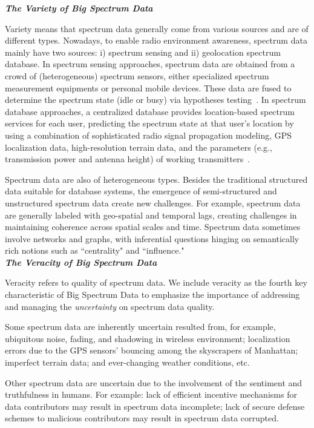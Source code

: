 \documentclass[12pt,draftcls,journal,letterpaper,oneside,onecolumn]{IEEEtran}
\begin{document}
\textbf{\emph{The Variety of Big Spectrum Data}}

Variety means that spectrum data generally come from various sources and are of different types. Nowadays, to enable radio environment awareness, spectrum data mainly have two sources: i) spectrum sensing and ii) geolocation spectrum database. In spectrum sensing approaches, spectrum data are obtained from a crowd of (heterogeneous) spectrum sensors, either specialized spectrum measurement equipments or personal mobile devices. These data are fused to determine the spectrum state (idle or busy) via hypotheses testing~\cite{SPMag2013}. In spectrum database approaches, a centralized database provides location-based spectrum services for each user, predicting the spectrum state at that user's location by using a combination of sophisticated radio signal propagation modeling, GPS localization data, high-resolution terrain data, and the parameters (e.g., transmission power and antenna height) of working transmitters~\cite{Senseless_2012}.

Spectrum data are also of heterogeneous types. Besides the traditional structured data suitable for database systems, the emergence of semi-structured and unstructured spectrum data create new challenges. For example, spectrum data are generally labeled with geo-spatial and temporal lags, creating challenges in maintaining coherence across spatial scales and time. Spectrum data sometimes involve networks and graphs, with inferential questions hinging on semantically rich notions such as ``centrality" and ``influence."
\\








\textbf{\emph{The Veracity of Big Spectrum Data}}


Veracity refers to quality of spectrum data. We include veracity as the fourth key characteristic of Big Spectrum Data to emphasize the importance of addressing and managing the \emph{uncertainty} on spectrum data quality.

Some spectrum data are inherently uncertain resulted from, for example, ubiquitous noise, fading, and shadowing in wireless environment; localization errors due to the GPS sensors' bouncing among the skyscrapers of Manhattan; imperfect terrain data; and ever-changing weather conditions, etc.

Other spectrum data are uncertain due to the involvement of the sentiment and truthfulness in humans. For example: lack of efficient incentive mechanisms for data contributors may result in spectrum data incomplete; lack of secure defense schemes to malicious contributors may result in spectrum data corrupted.
\end{document}
